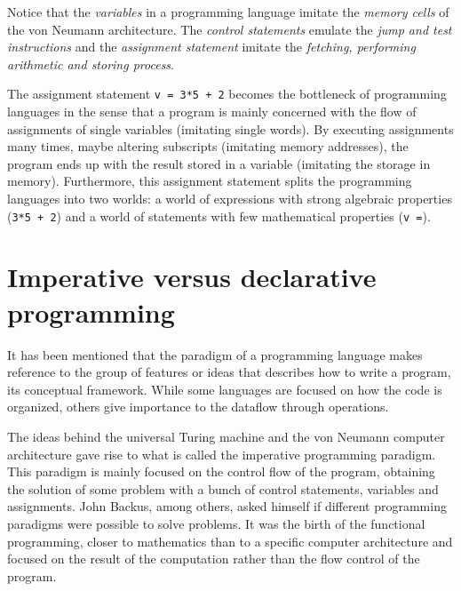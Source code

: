 Notice that the \textit{variables} in a programming language imitate the \textit{memory cells} of the von Neumann architecture.
The \textit{control statements} emulate the \textit{jump and test instructions} and
the \textit{assignment statement} imitate the \textit{fetching, performing arithmetic and storing process}. 

The assignment statement \texttt{v = 3*5 + 2} becomes the bottleneck of programming languages in the sense that a program is mainly concerned 
with the flow of assignments of single variables (imitating single words). 
By executing assignments many times, maybe altering subscripts (imitating memory addresses), 
the program ends up with the result stored in a variable (imitating the storage in memory). 
Furthermore, this assignment statement splits the programming languages into two worlds: 
a world of expressions with strong algebraic properties (\texttt{3*5 + 2}) and a world of statements with few mathematical properties (\texttt{v =}).





 
    \newpage
    \section{Imperative versus declarative programming}  \label{sec:impvsdec}
    \vspace{-.5cm}
It has been mentioned that the paradigm of a programming language makes reference to 
the group of features or ideas that describes how to write a program, its conceptual framework. 
While some languages are focused on how the code is organized, 
others give importance to the dataflow through operations.

The ideas behind the universal Turing machine and 
the von Neumann computer architecture gave rise 
to what is called the imperative programming paradigm. 
This paradigm is mainly focused on the control flow of the program,
obtaining the solution of some problem with a bunch of control statements,
variables and assignments. 
John Backus, among others, asked himself if different programming paradigms 
were possible to solve problems. 
It was the birth of the functional programming, closer to mathematics than to a specific computer 
architecture and focused on the result of the computation rather than the flow control of the program. 

